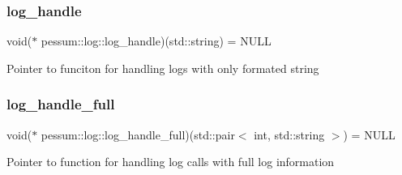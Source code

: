 \subsubsection{\texorpdfstring{log\+\_\+handle}{log\_handle}}
{\footnotesize\ttfamily void($\ast$ pessum\+::log\+::log\+\_\+handle)(std\+::string) = N\+U\+LL}

Pointer to funciton for handling logs with only formated string \mbox{\label{namespacepessum_1_1log_aa25914cc49048e5934cd41f86e74390f}} 
\subsubsection{\texorpdfstring{log\+\_\+handle\+\_\+full}{log\_handle\_full}}
{\footnotesize\ttfamily void($\ast$ pessum\+::log\+::log\+\_\+handle\+\_\+full)(std\+::pair$<$ int, std\+::string $>$) = N\+U\+LL}

Pointer to function for handling log calls with full log information 